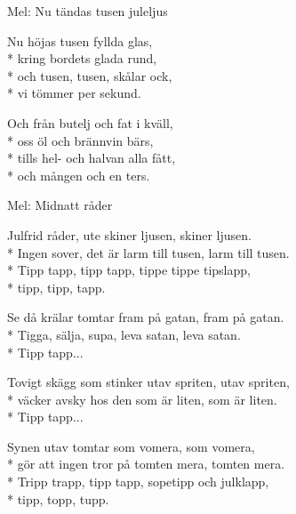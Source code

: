 \begin{SongText}
    \begin{SongVerse}
        Mel: Nu tändas tusen juleljus
    \end{SongVerse}
    \begin{SongVerse}
        Nu höjas tusen fyllda glas,\\*%
        kring bordets glada rund,\\*%
        och tusen, tusen, skålar ock,\\*%
        vi tömmer per sekund.
    \end{SongVerse}
    \begin{SongVerse}
        Och från butelj och fat i kväll,\\*%
        oss öl och brännvin bärs,\\*%
        tills hel- och halvan alla fått,\\*%
        och mången och en ters.
    \end{SongVerse}
\end{SongText}
\begin{SongText}
    \begin{SongVerse}
        Mel: Midnatt råder
    \end{SongVerse}
    \begin{SongVerse}
        Julfrid råder, ute skiner ljusen, skiner ljusen.\\*%
        Ingen sover, det är larm till tusen, larm till tusen.\\*%
        Tipp tapp, tipp tapp, tippe tippe tipslapp,\\*%
        tipp, tipp, tapp.
    \end{SongVerse}
    \begin{SongVerse}
        Se då krälar tomtar fram på gatan, fram på gatan.\\*%
        Tigga, sälja, supa, leva satan, leva satan.\\*%
        Tipp tapp...
    \end{SongVerse}
    \begin{SongVerse}
        Tovigt skägg som stinker utav spriten, utav spriten,\\*%
        väcker avsky hos den som är liten, som är liten.\\*%
        Tipp tapp...
    \end{SongVerse}
    \begin{SongVerse}
        Synen utav tomtar som vomera, som vomera,\\*%
        gör att ingen tror på tomten mera, tomten mera.\\*%
        Tripp trapp, tipp tapp, sopetipp och julklapp,\\*%
        tipp, topp, tupp.
    \end{SongVerse}
    \begin{SongVerse}
    \end{SongVerse}
\end{SongText}
